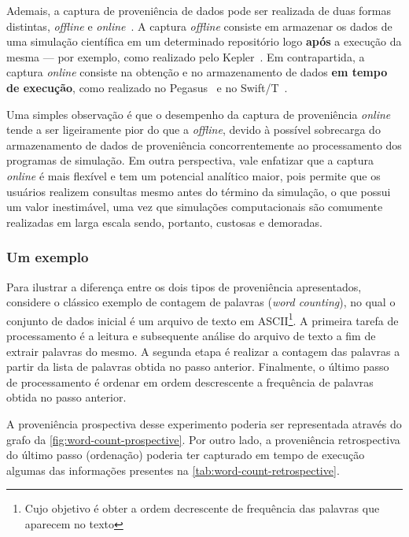 Ademais, a captura de proveniência de dados pode ser realizada de duas formas distintas, \textit{offline} e \textit{online}~\cite{silva2015propostadoutorado}. A captura \textit{offline} consiste em armazenar os dados de uma simulação científica em um determinado repositório logo \textbf{após} a execução da mesma --- por exemplo, como realizado pelo Kepler~\cite{ludascher2006scientific}. Em contrapartida, a captura \textit{online} consiste na obtenção e no armazenamento de dados \textbf{em tempo de execução}, como realizado no Pegasus~\cite{deelman2005pegasus} e no Swift/T~\cite{zhao2007swift}.

Uma simples observação é que o desempenho da captura de proveniência \textit{online} tende a ser ligeiramente pior do que a \textit{offline}, devido à possível sobrecarga do armazenamento de dados de proveniência concorrentemente ao processamento dos programas de simulação. Em outra perspectiva, vale enfatizar que a captura \textit{online} é mais flexível e tem um potencial analítico maior, pois permite que os usuários realizem consultas mesmo antes do término da simulação, o que possui um valor inestimável, uma vez que simulações computacionais são comumente realizadas em larga escala sendo, portanto, custosas e demoradas.

\subsubsection{Um exemplo}

Para ilustrar a diferença entre os dois tipos de proveniência apresentados, considere o clássico exemplo de contagem de palavras (\textit{word counting}), no qual o conjunto de dados inicial é um arquivo de texto em  ASCII\footnote{Cujo objetivo é obter a ordem decrescente de frequência das palavras que aparecem no texto}. A primeira tarefa de processamento é a leitura e subsequente análise do arquivo de texto a fim de extrair palavras do mesmo. A segunda etapa é realizar a contagem das palavras a partir da lista de palavras obtida no passo anterior. Finalmente, o último passo de processamento é ordenar em ordem descrescente a frequência de palavras obtida no passo anterior.

A proveniência prospectiva desse experimento poderia ser representada através do grafo da \autoref{fig:word-count-prospective}. Por outro lado, a proveniência retrospectiva do último passo (ordenação) poderia ter capturado em tempo de execução algumas das informações presentes na \autoref{tab:word-count-retrospective}.

